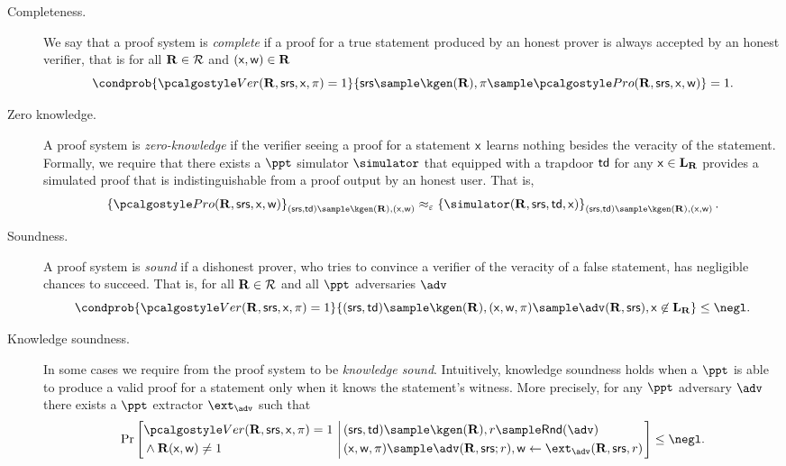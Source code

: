 \documentclass[runningheads,10pt]{llncs}
\numberwithin{equation}{section}
\begin{document}
\begin{description}
\item[Completeness.]  We say that a proof system is \emph{complete} if a proof
  for a true statement produced by an honest prover is always accepted by an
  honest verifier, that is for all $\mathbf{R} \in \mathcal{R}$ and
  $(\mathsf{x}, \mathsf{w}) \in \mathbf{R}$
\[
\condprob{\verifier(\REL, \srs, \inp, \zkproof) = 1}{\srs \sample
\kgen(\REL), \zkproof \sample
\prover(\REL, \srs, \inp, \wit)} = 1.
\]

\item[{Zero knowledge.}]
A proof system is \emph{zero-knowledge} if the verifier seeing a proof for a
statement $\mathsf{x}$ learns nothing besides the veracity of the statement.
Formally, we require that there exists a $\ppt$ simulator $\simulator$ that
equipped with a trapdoor $\mathsf{td}$ for any $\mathsf{x} \in \mathbf{L}_{\mathbf{R}}$ provides a
simulated proof that is indistinguishable from a proof output by an honest
user. That is,
\[
\fset{\prover(\REL, \srs, \inp, \wit)}_{(\srs, \td) \sample
\kgen(\REL), (\inp, \wit)} \approx_\eps \fset{\simulator(\REL,
\srs, \td, \inp)}_{(\srs, \td) \sample \kgen(\REL), (\inp, \wit)}.
\]

\item[{Soundness.}]
A proof system is \emph{sound} if a dishonest prover, who tries to convince a
verifier of the veracity of a false statement, has negligible chances to
succeed. That is, for all $\mathbf{R} \in \mathcal{R}$ and all $\ppt$ adversaries $\adv$
\[
\condprob{\verifier(\REL, \srs, \inp, \zkproof) = 1}{(\srs, \td) \sample
\kgen(\REL), (\inp, \wit, \zkproof) \sample \adv(\REL, \srs), \inp
\not\in \LAN_\REL} \leq \negl.
\]

\item[{Knowledge soundness.}]
In some cases we require from the proof system to be \emph{knowledge sound}.
Intuitively, knowledge soundness holds when a $\ppt$ is able to produce a valid
proof for a statement only when it knows the statement's witness. More
precisely, for any $\ppt$ adversary $\adv$ there exists a $\ppt$ extractor
$\ext_\adv$ such that
\[
\Pr
\left[
\begin{aligned}
& \verifier(\REL, \srs, \inp, \zkproof) = 1 \\
&  \land \REL(\inp, \wit) \neq 1
\end{aligned}
\,\left |\,
\begin{aligned}
& (\srs, \td) \sample \kgen(\REL), {r \sample \rand{\adv}} \\
& (\inp, \wit, \zkproof) \sample
\adv(\REL, \srs; r), \wit \gets \ext_\adv(\REL, \srs, r)
\end{aligned}
\right. \right] \leq \negl.
\]


\end{description}
\end{document}
